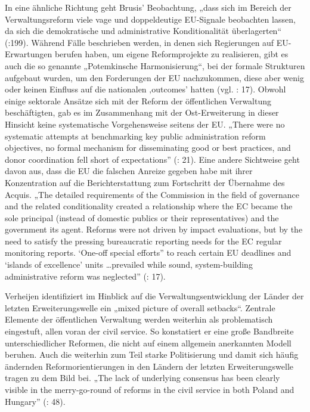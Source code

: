 In eine ähnliche Richtung geht Brusis’ Beobachtung, „dass sich im Bereich der Verwaltungsreform viele vage und doppeldeutige EU-Signale beobachten lassen, da sich die demokratische und administrative Konditionalität überlagerten“ (\cite{brusis09}:199). Während Fälle beschrieben werden, in denen sich Regierungen auf EU-Erwartungen berufen haben, um eigene Reformprojekte zu realisieren, gibt es auch die so genannte „Potemkinsche Harmonisierung“, bei der formale Strukturen aufgebaut wurden, um den Forderungen der EU nachzukommen, diese aber wenig oder keinen Einfluss auf die nationalen ‚outcomes’ hatten (vgl. \cite{schsed05a}: 17). Obwohl einige sektorale Ansätze sich mit der Reform der öffentlichen Verwaltung beschäftigten, gab es im Zusammenhang mit der Ost-Erweiterung in dieser Hinsicht keine systematische Vorgehensweise seitens der EU. „There were no systematic attempts at benchmarking key public administration reform objectives, no formal mechanism for disseminating good or best practices, and donor coordination fell short of expectations” (\cite{summa}: 21). Eine andere Sichtweise geht davon aus, dass die EU die falschen Anreize gegeben habe mit ihrer Konzentration auf die Berichterstattung zum Fortschritt der Übernahme des Acquis. „The detailed requirements of the Commission in the field of governance and the related conditionality created a relationship where the EC became the sole principal (instead of domestic publics or their representatives) and the government its agent. Reforms were not driven by impact evaluations, but by the need to satisfy the pressing bureaucratic reporting needs for the EC regular monitoring reports. ‘One-off special efforts” to reach certain EU deadlines and ‘islands of excellence’ units …prevailed while sound, system-building administrative reform was neglected” (\cite{mungiu}: 17). \par

Verheijen identifiziert im Hinblick auf die Verwaltungsentwicklung der Länder der letzten Erweiterungswelle ein „mixed picture of overall setbacks“. Zentrale Elemente der öffentlichen Verwaltung werden weiterhin als problematisch eingestuft, allen voran der civil service. So konstatiert er eine große Bandbreite unterschiedlicher Reformen, die nicht auf einem allgemein anerkannten Modell beruhen. Auch die weiterhin zum Teil starke Politisierung und damit sich häufig ändernden Reformorientierungen in den Ländern der letzten Erweiterungswelle tragen zu dem Bild bei. „The lack of underlying consensus has been clearly visible in the merry-go-round of reforms in the civil service in both Poland and Hungary” (\cite{verheijen06}: 48). \par


